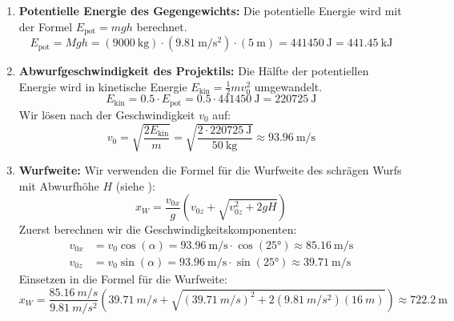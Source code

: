 \documentclass[ngerman]{scrreprt}
\newenvironment{loesungbox}[1]
  {\needspace{5\baselineskip}\begin{loesungboxstyle}[frametitle={#1}]}
  {\end{loesungboxstyle}}
\begin{document}
\begin{loesungbox}{Lösung zu \Cref{aufg:trebuchet}}
\begin{enumerate}
    \item \textbf{Potentielle Energie des Gegengewichts:}
    Die potentielle Energie wird mit der Formel $E_{\text{pot}} = mgh$ berechnet.
    \begin{equation}
        E_{\text{pot}} = Mgh = (\SI{9000}{\kilo\gram}) \cdot (\SI{9.81}{\meter\per\second\squared}) \cdot (\SI{5}{\meter}) = \SI{441450}{\joule} = \SI{441.45}{\kilo\joule}
    \end{equation}
    
    \item \textbf{Abwurfgeschwindigkeit des Projektils:}
    Die Hälfte der potentiellen Energie wird in kinetische Energie $E_{\text{kin}} = \frac{1}{2}mv_0^2$ umgewandelt. 
    \begin{equation}
        E_{\text{kin}} = 0.5 \cdot E_{\text{pot}} = 0.5 \cdot \SI{441450}{\joule} = \SI{220725}{\joule}
    \end{equation}
    Wir lösen nach der Geschwindigkeit $v_0$ auf:
    \begin{equation}
        v_0 = \sqrt{\frac{2 E_{\text{kin}}}{m}} = \sqrt{\frac{2 \cdot \SI{220725}{\joule}}{\SI{50}{\kilo\gram}}} \approx \SI{93.96}{\meter\per\second}
    \end{equation}
    
    \item \textbf{Wurfweite:}
    Wir verwenden die Formel für die Wurfweite des schrägen Wurfs mit Abwurfhöhe $H$ (siehe ):
    \begin{equation}
        x_W = \frac{v_{0x}}{g}\left(v_{0z} + \sqrt{v_{0z}^2 + 2gH}\right)
    \end{equation}
    Zuerst berechnen wir die Geschwindigkeitskomponenten:
    \begin{align}
        v_{0x} &= v_0 \cos(\alpha) = \SI{93.96}{\meter\per\second} \cdot \cos(\ang{25}) \approx \SI{85.16}{\meter\per\second} \\ 
        v_{0z} &= v_0 \sin(\alpha) = \SI{93.96}{\meter\per\second} \cdot \sin(\ang{25}) \approx \SI{39.71}{\meter\per\second} 
    \end{align}
    Einsetzen in die Formel für die Wurfweite:
    \begin{equation}
        x_W = \frac{\SI{85.16}{m/s}}{\SI{9.81}{m/s^2}}\left(\SI{39.71}{m/s} + \sqrt{(\SI{39.71}{m/s})^2 + 2(\SI{9.81}{m/s^2})(\SI{16}{m})}\right) \approx \SI{722.2}{\meter}
    \end{equation}
\end{enumerate}
\end{loesungbox}
\end{document}
